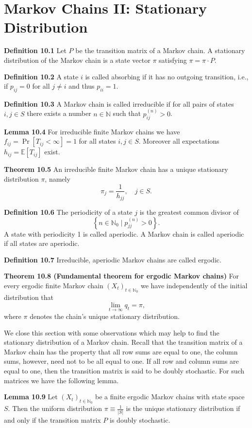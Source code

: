 \section{Markov Chains II: Stationary Distribution}
\textbf{Definition 10.1} Let $P$ be the transition matrix of a Markov chain. A stationary distribution of the Markov chain is a state vector $\pi$ satisfying $\pi=\pi \cdot P$.

\textbf{Definition 10.2} A state $i$ is called absorbing if it has no outgoing transition, i.e., if $p_{i j}=0$ for all $j \neq i$ and thus $p_{i i}=1$.

\textbf{Definition 10.3} A Markov chain is called irreducible if for all pairs of states $i, j \in S$ there exists a number $n \in \mathbb{N}$ such that $p_{i j}^{(n)}>0$.

\textbf{Lemma 10.4} For irreducible finite Markov chains we have $f_{i j}=\operatorname{Pr}\left[T_{i j}<\infty\right]=1$ for all states $i, j \in S$. Moreover all expectations $h_{i j}=\mathbb{E}\left[T_{i j}\right]$ exist.

\textbf{Theorem 10.5} An irreducible finite Markov chain has a unique stationary distribution $\pi$, namely
$$
\pi_{j}=\frac{1}{h_{j j}}, \quad j \in S .
$$

\textbf{Definition 10.6} The periodicity of a state $j$ is the greatest common divisor of
$$
\left\{n \in \mathbb{N}_{0} \mid p_{j j}^{(n)}>0\right\} .
$$
A state with periodicity 1 is called aperiodic. A Markov chain is called aperiodic if all states are aperiodic.

\textbf {Definition 10.7} Irreducible, aperiodic Markov chains are called ergodic. 

\textbf{Theorem 10.8 (Fundamental theorem for ergodic Markov chains)} For every ergodic finite Markov chain $\left(X_{t}\right)_{t \in \mathbb{N}_{0}}$ we have independently of the initial distribution that
$$
\lim _{t \rightarrow \infty} q_{t}=\pi,
$$
where $\pi$ denotes the chain's unique stationary distribution.

We close this section with some observations which may help to find the stationary distribution of a Markov chain. Recall that the transition matrix of a Markov chain has the property that all row sums are equal to one, the column sums, however, need not to be all equal to one. If all row and column sums are equal to one, then the transition matrix is said to be doubly stochastic. For such matrices we have the following lemma.

\textbf{Lemma 10.9} Let $\left(X_{t}\right)_{t \in \mathbb{N}_{0}}$ be a finite ergodic Markov chains with state space $S$. Then the uniform distribution $\pi \equiv \frac{1}{|S|}$ is the unique stationary distribution if and only if the transition matrix $P$ is doubly stochastic.

